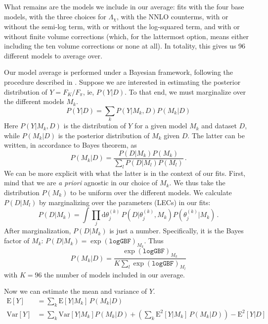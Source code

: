 \documentclass[prd,tightenlines,preprintnumbers,showpacs,superscriptaddress,notitlepage,eqsecnum,floatfix,notitlepage]{revtex4-1}
\begin{document}
What remains are the models we include in our average: fits with the four base models, with the three choices for $\Lambda_\chi$, with the NNLO counterms, with or without the semi-log term, with or without the log-squared term, and with or without finite volume corrections (which, for the lattermost option, means either including the ten volume corrections or none at all). In totality, this gives us 96 different models to average over.

Our model average is performed under a Bayesian framework, following the procedure described in \cite{Chang_2018}. Suppose we are interested in estimating the posterior distribution of $Y = F_K / F_\pi$, ie, $P(Y|D)$. To that end, we must marginalize over the different models $M_k$. 
\begin{equation}
P(Y|D) = \sum_k P(Y | M_k, D) P(M_k | D)
\end{equation}
Here $P(Y | M_k, D)$ is the distribution of $Y$ for a given model $M_k$ and dataset $D$, while $P(M_k | D)$ is the posterior distribution of $M_k$ given $D$. The latter can be written, in accordance to Bayes theorem, as 
\begin{equation}
P(M_k | D) = \frac{P(D | M_k) P(M_k)}{\sum_l P(D | M_l) P(M_l)} \, .
\end{equation}
We can be more explicit with what the latter is in the context of our fits. First, mind that we are \emph{a priori} agnostic in our choice of $M_k$. We thus take the distribution $P(M_k)$ to be uniform over the different models. We calculate $P(D | M_l)$ by marginalizing over the parameters (LECs) in our fits:
\begin{equation}
P(D | M_k) = \int \prod_j \text{d} \theta_j^{(k)} \,  P(D | \theta_j^{(k)}, M_k) P(\theta_j^{(k)} | M_k) \, .
\end{equation}
After marginalization, $P(D | M_k)$ is just a number. Specifically, it is the Bayes factor of $M_k$: $P(D | M_k) = \exp(\texttt{logGBF})_{M_k}$. Thus
\begin{equation}
P(M_k | D) = \frac{\exp(\texttt{logGBF})_{M_k}}{K \sum_l \exp(\texttt{logGBF})_{M_l}}
\end{equation}
with $K = 96$ the number of models included in our average.

Now we can estimate the mean and variance of $Y$.
\begin{align}
\text{E}[Y] &= \sum_k \text{E}[Y | M_k] \, P(M_k | D)  \\
\text{Var}[Y] &= \sum_k \text{Var}[Y | M_k] P(M_k | D)
+ \left( \sum_k \text{E}^2[Y | M_k] \, P(M_k | D)\right) 
- \text{E}^2[Y | D] \nonumber
\end{align}
\end{document}
